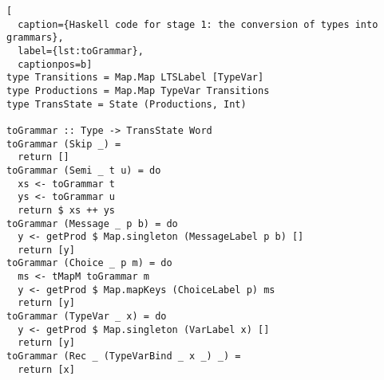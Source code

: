 \begin{lstlisting}[
  caption={Haskell code for stage 1: the conversion of types into grammars},
  label={lst:toGrammar},
  captionpos=b]
type Transitions = Map.Map LTSLabel [TypeVar]
type Productions = Map.Map TypeVar Transitions
type TransState = State (Productions, Int)

toGrammar :: Type -> TransState Word
toGrammar (Skip _) =
  return []
toGrammar (Semi _ t u) = do
  xs <- toGrammar t
  ys <- toGrammar u
  return $ xs ++ ys
toGrammar (Message _ p b) = do
  y <- getProd $ Map.singleton (MessageLabel p b) []
  return [y]
toGrammar (Choice _ p m) = do
  ms <- tMapM toGrammar m
  y <- getProd $ Map.mapKeys (ChoiceLabel p) ms
  return [y]
toGrammar (TypeVar _ x) = do      
  y <- getProd $ Map.singleton (VarLabel x) []
  return [y]
toGrammar (Rec _ (TypeVarBind _ x _) _) =
  return [x]
\end{lstlisting}


